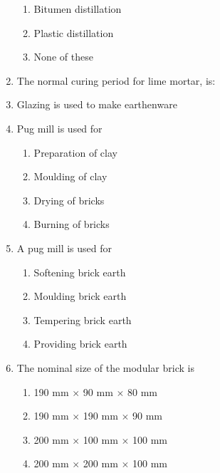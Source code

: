 \documentclass[11pt,a4paper]{article}
\begin{document}
\begin{enumerate}
\begin{enumerate}[label=\Alph*.]
\item{Bitumen distillation}
\item{Plastic distillation}
\item{None of these}
\end{enumerate}
\item{The normal curing period for lime mortar, is:}
\\
\item{Glazing is used to make earthenware}
\\
\item{Pug mill is used for}
\begin{enumerate}[label=\Alph*.]
\item{Preparation of clay}
\item{Moulding of clay}
\item{Drying of bricks}
\item{Burning of bricks}
\end{enumerate}
\item{A pug mill is used for}
\begin{enumerate}[label=\Alph*.]
\item{Softening brick earth}
\item{Moulding brick earth}
\item{Tempering brick earth}
\item{Providing brick earth}
\end{enumerate}
\item{The nominal size of the modular brick is}
\begin{enumerate}[label=\Alph*.]
\item{190 mm $\times$ 90 mm $\times$ 80 mm}
\item{190 mm $\times$ 190 mm $\times$ 90 mm}
\item{200 mm $\times$ 100 mm $\times$ 100 mm}
\item{200 mm $\times$ 200 mm $\times$ 100 mm}

\end{enumerate}
\end{enumerate}
\end{document}
